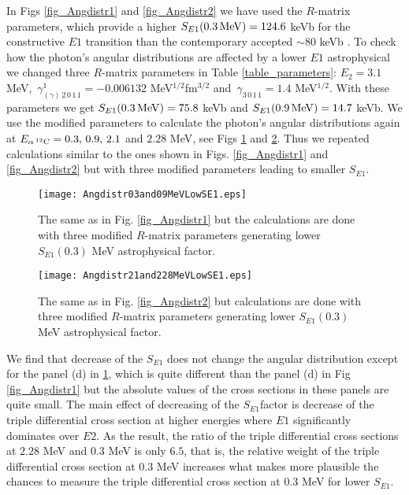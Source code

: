 \documentclass[prl,unsortedaddress,groupedaddress,twocolumn,amsmath,amsfonts,amssymb,showpacs,floatfix,nofootinbib]{revtex4}
\begin{document}
In Figs  \ref{fig_Angdistr1} and \ref{fig_Angdistr2} we have used the $R$-matrix parameters, which 
provide a higher $S_{E1}(0.3\,{\rm MeV})= 124.6$ keVb for the constructive $E1$ transition than the contemporary accepted  $\sim 80$ keVb \cite{gai2015}. To check how the photon's angular distributions are affected by a lower $E1$ astrophysical we changed three $R$-matrix parameters
in Table \ref{table_parameters}:  $E_{2} =3.1$ MeV,  $\,\gamma_{(\gamma)\,2\,0\,1\,1}^{1} = -0.006132$ MeV${}^{1/2}$fm${}^{3/2}$ and  $\,\gamma_{3\,0\,1\,1}=1.4$ MeV$^{1/2}$.
With these parameters we get $S_{E1}(0.3\,{\rm MeV})= 75.8$ keVb and $S_{E1}(0.9\,{\rm MeV}) =14.7$ keVb. We use the modified parameters to calculate the photon's angular distributions again 
at $E_{\alpha\,{}^{12}{\rm C}}=0.3,\,0.9,\,2.1$ and $2.28$ MeV, see Figs \ref{fig_Angdistr3} and \ref{fig_Angdistr4}. Thus we repeated calculations similar to the ones shown in Figs. \ref{fig_Angdistr1} and \ref{fig_Angdistr2} but with three modified parameters leading to smaller $S_{E1}$.

\begin{figure}
[tbp] 
 \texttt{[image: Angdistr03and09MeVLowSE1.eps]}
 \caption{The same as in Fig.  \ref{fig_Angdistr1} but the calculations are done with three modified $R$-matrix parameters generating lower $S_{E1}(0.3)$ MeV astrophysical factor. }  \label{fig_Angdistr3}
\end{figure}
\begin{figure}
[tbp] 
 \texttt{[image: Angdistr21and228MeVLowSE1.eps]}
 \caption{The same as in Fig.  \ref{fig_Angdistr2} but calculations are done with three modified $R$-matrix parameters generating lower $S_{E1}(0.3)$ MeV astrophysical factor.}  \label{fig_Angdistr4}
\end{figure}

We find that decrease of the $S_{E1}$ does not change the angular distribution except for the panel (d) in \ref{fig_Angdistr3}, which is quite different than the panel (d) in Fig \ref{fig_Angdistr1}  but the absolute values of the cross sections in these panels are quite small. The main effect of decreasing of the $S_{E1}$factor is decrease of the triple differential cross section at higher energies where $E1$ significantly dominates over $E2$. As the result,
the ratio of the triple differential cross sections at $2.28$ MeV and $0.3$ MeV is only $6.5$, that is, the relative weight of the triple differential cross section at $0.3$ MeV increases what makes more plausible the chances to measure the triple differential cross section at $0.3$ MeV for lower $S_{E1}$. 
\end{document}

